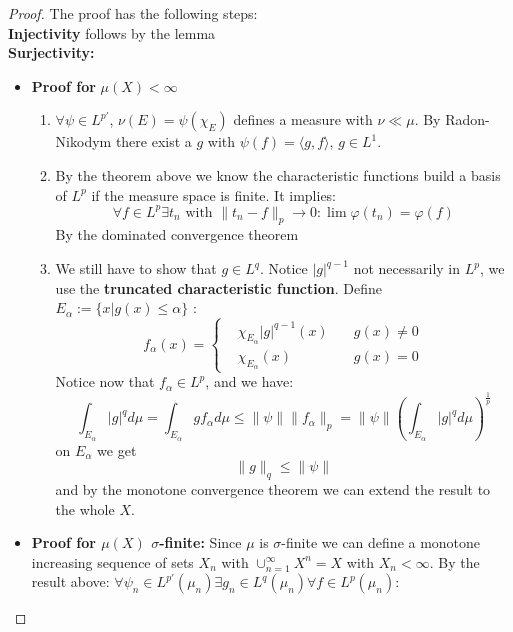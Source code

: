 \documentclass[a4paper,11pt,fleqn]{book}
\theoremstyle{definition}
\theoremstyle{remark}
\begin{document}
\begin{proof}
	The proof has the following steps:\\ 
	\textbf{Injectivity} follows by the lemma\\
	\textbf{Surjectivity:}
	\begin{itemize}
		\item \textbf{Proof for} $\mu(X) < \infty$
			\begin{enumerate}
				\item $\forall \psi \in L^{p'}$, $\nu(E) = \psi(\chi_E)$ defines a measure with $\nu \ll \mu$. By Radon-Nikodym there exist a $g$ with $\psi(f) = \langle g, f\rangle$, $g \in L^1$. 
				\item By the theorem above we know the characteristic functions build a basis of $L^p$ if the measure space is finite. It implies:
					\begin{equation*}
						\forall f \in L^p \exists t_n \text{ with } \|t_n - f\|_p \rightarrow 0 : \lim \varphi(t_n) = \varphi(f)
					\end{equation*}
					By the dominated convergence theorem
				\item We still have to show that $g \in L^q$. Notice $|g|^{q - 1}$ not necessarily in $L^p$, we use the \textbf{truncated characteristic function}. Define $E_\alpha := \{x|g(x) \leq \alpha \}$  :
				\begin{equation*}
					f_\alpha(x) = 
					\left\{\begin{aligned}
						&\chi_{E_\alpha} |g|^{q - 1}(x) \quad &g(x) \neq 0 \\
						&\chi_{E_\alpha} (x) \quad &g(x) = 0
					\end{aligned}\right.
				\end{equation*}
				Notice now that $f_\alpha \in L^p$, and we have:
				\begin{equation*}
					\int_{E_\alpha} |g|^q d\mu= \int_{E_\alpha}g f_\alpha d\mu 
					\leq \|\psi\|\|f_\alpha\|_p = \|\psi\|(\int_{E_\alpha}|g|^q d\mu)^{\frac{1}{p}}
				\end{equation*}
				on $E_\alpha$ we get
				\begin{equation*}
					\|g\|_q \leq \|\psi\|
				\end{equation*}
				and by the monotone convergence theorem we can extend the result to the whole $X$.
			\end{enumerate}
		\item \textbf{Proof for $\mu(X)$ $\sigma$-finite:}
			Since $\mu$ is $\sigma$-finite we can define a monotone increasing sequence of sets $X_n$ with $\cup_{n = 1}^\infty X^n = X$ with $X_n < \infty$. By the result above: $\forall \psi_n \in L^{p'}(\mu_n) \exists g_n \in L^q(\mu_n) \forall f \in L^p(\mu_n)$:

\end{itemize}
\end{proof}
\end{document}
